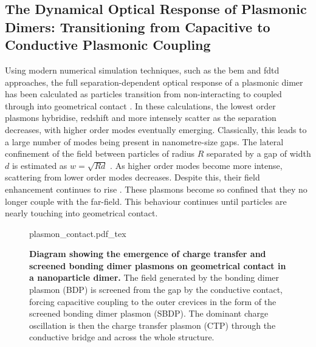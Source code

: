 \documentclass{article}
\begin{document}
\FloatBarrier
\subsection{The Dynamical Optical Response of Plasmonic Dimers: Transitioning from Capacitive to Conductive Plasmonic Coupling}

Using modern numerical simulation techniques, such as the \gls{bem} and \gls{fdtd} approaches, the full separation-dependent optical response of a plasmonic dimer has been calculated as particles transition from non-interacting to coupled through into geometrical contact \cite{romero2006}. In these calculations, the lowest order plasmons hybridise, redshift and more intensely scatter as the separation decreases, with higher order modes eventually emerging. Classically, this leads to a large number of modes being present in nanometre-size gaps. The lateral confinement of the field between particles of radius $R$ separated by a gap of width $d$ is estimated as $w=\sqrt{Rd}$ \cite{romero2006}. As higher order modes become more intense, scattering from lower order modes decreases. Despite this, their field enhancement continues to rise \cite{esteban2012}. These plasmons become so confined that they no longer couple with the far-field. This behaviour continues until particles are nearly touching into geometrical contact. %

\begin{figure}[bt]
\centering
\fontsize{10pt}{1em}\selectfont
\def\svgwidth{0.65\textwidth}
{plasmon_contact.pdf_tex}
\caption[Diagram showing the emergence of charge transfer and screened bonding dimer plasmons on geometrical contact in a nanoparticle dimer]{\textbf{Diagram showing the emergence of charge transfer and screened bonding dimer plasmons on geometrical contact in a nanoparticle dimer.} The field generated by the bonding dimer plasmon (BDP) is screened from the gap by the conductive contact, forcing capacitive coupling to the outer crevices in the form of the screened bonding dimer plasmon (SBDP). The dominant charge oscillation is then the charge transfer plasmon (CTP) through the conductive bridge and across the whole structure.}
\label{fig:plasmon_contact}
\end{figure}
\end{document}
